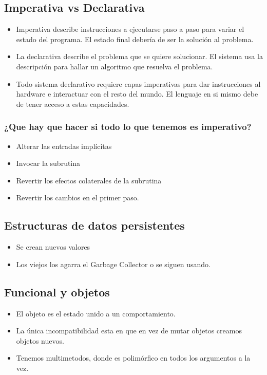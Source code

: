 
\subsection*{Imperativa vs Declarativa}
\begin{itemize}
\item Imperativa describe instrucciones a ejecutarse paso a paso para variar el estado del programa. El estado final debería de ser la solución al problema.
\item La declarativa describe el problema que se quiere solucionar. El sistema usa la descripción para hallar un algoritmo que resuelva el problema.
\item Todo sistema declarativo requiere capas imperativas para dar instrucciones al hardware e interactuar con el resto del mundo. El lenguaje en si mismo debe de tener acceso a estas capacidades.
\end{itemize}



\subsubsection*{¿Que hay que hacer si todo lo que tenemos es imperativo?}
\begin{itemize}
\item Alterar las entradas implícitas
\item Invocar la subrutina
\item Revertir los efectos colaterales de la subrutina
\item Revertir los cambios en el primer paso.
\end{itemize}

\subsection*{Estructuras de datos persistentes}
\begin{itemize}
\item Se crean nuevos valores
\item Los viejos los agarra el Garbage Collector o se siguen usando.
\end{itemize}

\subsection*{Funcional y objetos}
\begin{itemize}
\item El objeto es el estado unido a un comportamiento.
\item La única incompatibilidad esta en que en vez de mutar objetos creamos objetos nuevos.
\item Tenemos multimetodos, donde es polimórfico en todos los argumentos a la vez.
\end{itemize}



